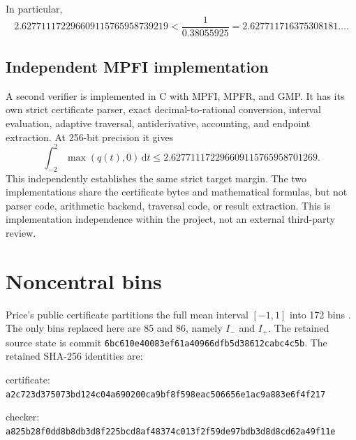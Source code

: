 \documentclass[11pt]{article}
\newcommand{\dd}{\,\mathrm{d}}
\begin{document}
In particular,
\[
  2.627711172296609115765958739219
  <\frac1{0.38055925}
  =2.627711716375308181\ldots.
\]

\subsection{Independent MPFI implementation}

A second verifier is implemented in C with MPFI, MPFR, and GMP. It has its own
strict certificate parser, exact decimal-to-rational conversion, interval
evaluation, adaptive traversal, antiderivative, accounting, and endpoint
extraction. At 256-bit precision it gives
\[
  \int_{-2}^{2}\max(q(t),0)\dd t
  \le2.627711172296609115765958701269.
\]
This independently establishes the same strict target margin. The two
implementations share the certificate bytes and mathematical formulas, but
not parser code, arithmetic backend, traversal code, or result extraction.
This is implementation independence within the project, not an external
third-party review.

\section{Noncentral bins}

Price's public certificate partitions the full mean interval \([-1,1]\) into
172 bins \cite{Price2026}. The only bins replaced here are 85 and 86, namely
\(I_-\) and \(I_+\). The retained source state is commit
\texttt{6bc610e40083ef61a40966dfb5d38612cabc4c5b}. The retained SHA-256 identities
are:
\begin{center}
\begin{minipage}{0.94\linewidth}
\small
certificate:\quad
\texttt{a2c723d375073bd124c04a690200ca9bf8f598eac506656e1ac9a883e6f4f217}

\smallskip
checker:\quad
\texttt{a825b28f0dd8b8db3d8f225bcd8af48374c013f2f59de97bdb3d8d8cd62a49f11e}
\end{minipage}
\end{center}
\end{document}
